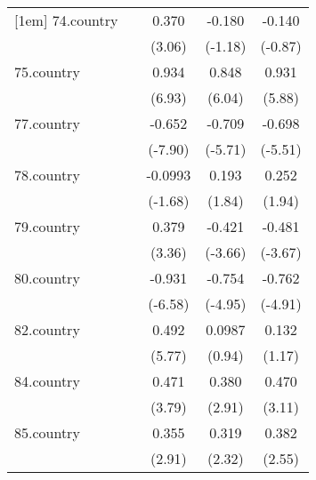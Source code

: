 {\begin{tabular}{l*{4}{c}}
[1em]
74.country  &                     &       0.370\sym{**} &      -0.180         &      -0.140         \\
            &                     &      (3.06)         &     (-1.18)         &     (-0.87)         \\
[1em]
75.country  &                     &       0.934\sym{***}&       0.848\sym{***}&       0.931\sym{***}\\
            &                     &      (6.93)         &      (6.04)         &      (5.88)         \\
[1em]
77.country  &                     &      -0.652\sym{***}&      -0.709\sym{***}&      -0.698\sym{***}\\
            &                     &     (-7.90)         &     (-5.71)         &     (-5.51)         \\
[1em]
78.country  &                     &     -0.0993         &       0.193         &       0.252         \\
            &                     &     (-1.68)         &      (1.84)         &      (1.94)         \\
[1em]
79.country  &                     &       0.379\sym{***}&      -0.421\sym{***}&      -0.481\sym{***}\\
            &                     &      (3.36)         &     (-3.66)         &     (-3.67)         \\
[1em]
80.country  &                     &      -0.931\sym{***}&      -0.754\sym{***}&      -0.762\sym{***}\\
            &                     &     (-6.58)         &     (-4.95)         &     (-4.91)         \\
[1em]
82.country  &                     &       0.492\sym{***}&      0.0987         &       0.132         \\
            &                     &      (5.77)         &      (0.94)         &      (1.17)         \\
[1em]
84.country  &                     &       0.471\sym{***}&       0.380\sym{**} &       0.470\sym{**} \\
            &                     &      (3.79)         &      (2.91)         &      (3.11)         \\
[1em]
85.country  &                     &       0.355\sym{**} &       0.319\sym{*}  &       0.382\sym{*}  \\
            &                     &      (2.91)         &      (2.32)         &      (2.55)         \\

\end{tabular}}
